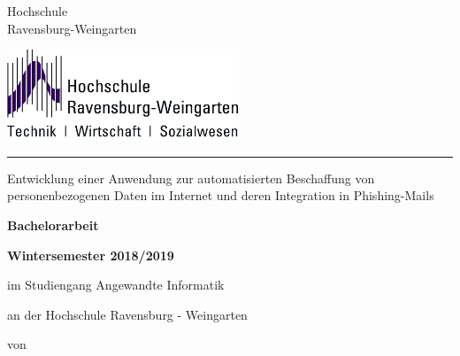 
\thispagestyle{empty}
{
\normalsize{} \fontsize{12pt}{10}\selectfont 
\vspace{-1cm}
\begin{minipage}[b]{9.4cm}
{\fontsize{13pt}{13} \selectfont%
Hochschule\\[1ex]
Ravensburg-Weingarten}\\[1ex]
\end{minipage}
}
\begin{minipage}[b]{10cm}
\includegraphics*[height=2.7cm]{bilder/HSLogoWGd}
\end{minipage}


\vspace{10mm}
 
\hrule 
\vspace{1cm}
{
 \fontsize{20pt}{20}  \selectfont%
\begin{center}
Entwicklung einer Anwendung zur automatisierten Beschaffung von personenbezogenen Daten im Internet und deren Integration in Phishing-Mails %
\end{center}
}

\begin{center}
\large \textbf{Bachelorarbeit} %
\end{center}

\begin{center}
\textbf{Wintersemester 2018/2019} %
\end{center}

\vspace{5mm}

\begin{center}
im Studiengang Angewandte Informatik %
\end{center}

\begin{center}
an der Hochschule Ravensburg - Weingarten 
\end{center}
\begin{center}

\end{center}
\vspace{5mm}
\begin{center}
von
\end{center}




